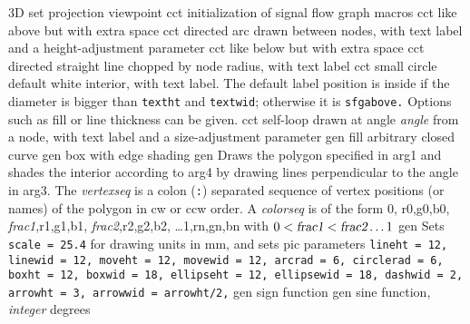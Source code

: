   {3D}
  {set projection viewpoint}
  {cct}
  {initialization of signal flow graph macros}
  {cct}
  {like above but with extra space}
  {cct}
  {directed arc drawn between nodes, with text label
    and a height-adjustment parameter }
  {cct}
  {like below but with extra space}
  {cct}
  {directed straight line chopped by node radius, with text label}
  {cct}
  {small circle default white interior, with text label. The default label
  position is inside if the diameter is bigger than {\tt textht} and
  {\tt textwid}; otherwise it is {\tt sfgabove.} Options such as fill or
  line thickness can be given.}
  {cct}
  {self-loop drawn at angle {\sl angle} from a node,
     with text label and a size-adjustment parameter }
  {gen}
  {fill arbitrary closed curve}
  {gen}
  {box with edge shading}
  {gen}
  {Draws the polygon specified in arg1 and shades the interior according
   to arg4 by drawing lines perpendicular to the angle in arg3.
   The {\sl vertexseq} is a colon ({\tt:}) separated sequence of vertex
   positions (or names) of the polygon in cw or ccw order. A {\sl colorseq}
   is of the form 0, r0,g0,b0, {\sl frac1},r1,g1,b1, {\sl frac2},r2,g2,b2,
   \ldots 1,rn,gn,bn with $0 < \hbox{\sl frac1} < \hbox{\sl frac2} \ldots 1$
}
  {gen}
  {Sets {\tt scale = 25.4} for drawing units in mm, and sets
   pic parameters {\tt lineht = 12, linewid = 12, moveht = 12, movewid = 12,
    arcrad = 6, circlerad = 6, boxht = 12, boxwid = 18, ellipseht = 12,
    ellipsewid = 18, dashwid = 2, arrowht = 3, arrowwid = arrowht/2,}}
  {gen}
  {sign function}
  {gen}
  {sine function, {\sl integer\/} degrees}
